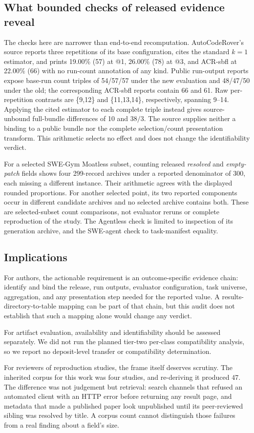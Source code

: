 \subsection{What bounded checks of released evidence reveal}

The checks here are narrower than end-to-end recomputation. AutoCodeRover's source reports
three repetitions of its base configuration, cites the standard $k=1$ estimator, and prints
19.00\% (57) at @1, 26.00\% (78) at @3, and ACR-sbfl at 22.00\% (66) with no run-count
annotation of any kind. Public run-output reports expose base-run count triples of 54/57/57 under
the new evaluation and 48/47/50 under the old; the corresponding ACR-sbfl reports contain 66
and 61. Raw per-repetition contrasts are \{9,12\} and \{11,13,14\}, respectively, spanning
9--14. Applying the cited estimator to each complete triple instead gives source-unbound
full-bundle differences of 10 and $38/3$. The source supplies neither a binding to a public
bundle nor the complete selection/count presentation transform. This arithmetic selects no
effect and does not change the identifiability verdict.

For a selected SWE-Gym Moatless subset, counting released \emph{resolved} and
\emph{empty-patch} fields shows four 299-record archives under a reported denominator of 300,
each missing a different instance. Their arithmetic agrees with the displayed rounded
proportions. For another selected point, its two reported components occur in different
candidate archives and no selected archive contains both. These are selected-subset count
comparisons, not evaluator reruns or complete reproduction of the study. The Agentless check
is limited to inspection of its generation archive, and the SWE-agent check to task-manifest
equality.

\subsection{Implications}

For authors, the actionable requirement is an outcome-specific evidence chain: identify and
bind the release, run outputs, evaluator configuration, task universe, aggregation, and any
presentation step needed for the reported value. A results-directory-to-table mapping can be
part of that chain, but this audit does not establish that such a mapping alone would change
any verdict.

For artifact evaluation, availability and identifiability should be assessed separately. We
did not run the planned tier-two per-class compatibility analysis, so we report no
deposit-level transfer or compatibility determination.

For reviewers of reproduction studies, the frame itself deserves scrutiny. The inherited
corpus for this work was four studies, and re-deriving it produced 47. The difference was
not judgement but retrieval: search channels that refused an automated client with an HTTP
error before returning any result page, and metadata that made a published paper look
unpublished until its peer-reviewed sibling was resolved by title. A corpus count cannot distinguish those failures from a real finding about a
field's size.
